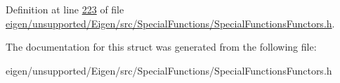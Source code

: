Definition at line \hyperlink{eigen_2unsupported_2_eigen_2src_2_special_functions_2_special_functions_functors_8h_source_l00223}{223} of file \hyperlink{eigen_2unsupported_2_eigen_2src_2_special_functions_2_special_functions_functors_8h_source}{eigen/unsupported/\+Eigen/src/\+Special\+Functions/\+Special\+Functions\+Functors.\+h}.



The documentation for this struct was generated from the following file\+:\begin{DoxyCompactItemize}
\item 
eigen/unsupported/\+Eigen/src/\+Special\+Functions/\+Special\+Functions\+Functors.\+h\end{DoxyCompactItemize}
